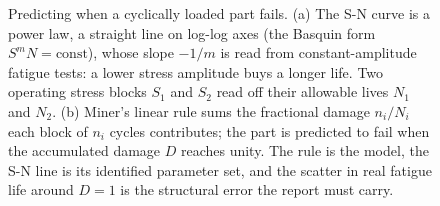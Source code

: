 \begin{figure}[htbp]
\caption[Fatigue-life prediction by the S-N curve and Miner's rule]{Predicting
when a cyclically loaded part fails. (a) The S-N curve is a power law, a
straight line on log-log axes (the Basquin form $S^m N = \text{const}$), whose
slope $-1/m$ is read from constant-amplitude fatigue tests: a lower stress
amplitude buys a longer life. Two operating stress blocks $S_1$ and $S_2$ read
off their allowable lives $N_1$ and $N_2$. (b) Miner's linear rule sums the
fractional damage $n_i/N_i$ each block of $n_i$ cycles contributes; the part is
predicted to fail when the accumulated damage $D$ reaches unity. The rule is
the model, the S-N line is its identified parameter set, and the scatter in
real fatigue life around $D=1$ is the structural error the report must carry.}
\label{fig:vol02ch18:fatigue-life}
\end{figure}
